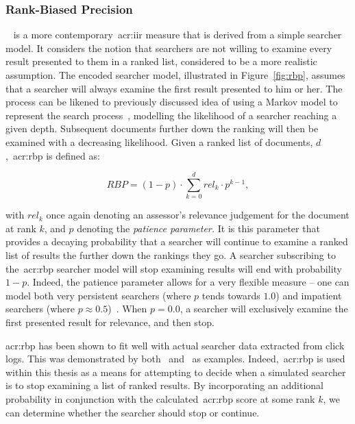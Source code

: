 \subsubsection{Rank-Biased Precision}
~\citep{moffat2008rbp} is a more contemporary~\gls{acr:iir} measure that is derived from a simple searcher model. It considers the notion that searchers are not willing to examine every result presented to them in a ranked list, considered to be a more realistic assumption. The encoded searcher model, illustrated in Figure~\ref{fig:rbp}, assumes that a searcher will always examine the first result presented to him or her. The process can be likened to previously discussed idea of using a Markov model to represent the search process~\cite{tran2017markov_models}, modelling the likelihood of a searcher reaching a given depth. Subsequent documents further down the ranking will then be examined with a decreasing likelihood. Given a ranked list of documents, $d$,~\gls{acr:rbp} is defined as:

\begin{equation*}
RBP = (1 - p) \cdot \sum_{k=0}^{d}rel_k \cdot p^{k-1},
\end{equation*}

with $rel_k$ once again denoting an assessor's relevance judgement for the document at rank $k$, and $p$ denoting the \emph{patience parameter.} It is this parameter that provides a decaying probability that a searcher will continue to examine a ranked list of results the further down the rankings they go. A searcher subscribing to the~\gls{acr:rbp} searcher model will stop examining results will end with probability $1-p$. Indeed, the patience parameter allows for a very flexible measure -- one can model both very persistent searchers (where $p$ tends towards $1.0$) and impatient searchers (where $p\approx0.5$)~\citep{moffat2008rbp}. When $p=0.0$, a searcher will exclusively examine the first presented result for relevance, and then stop.

\gls{acr:rbp} has been shown to fit well with actual searcher data extracted from click logs. This was demonstrated by both~\cite{chapelle2009rbp} and~\cite{zhang2010click_rbp} as examples. Indeed,~\gls{acr:rbp} is used within this thesis as a means for attempting to decide when a simulated searcher is to stop examining a list of ranked results. By incorporating an additional probability in conjunction with the calculated~\gls{acr:rbp} score at some rank $k$, we can determine whether the searcher should stop or continue.

